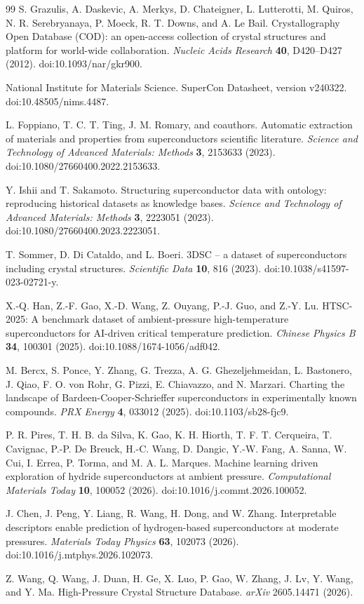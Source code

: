 \documentclass[11pt,a4paper]{ctexart}
\begin{document}
\begin{thebibliography}{99}
S. Grazulis, A. Daskevic, A. Merkys, D. Chateigner, L. Lutterotti, M. Quiros, N. R. Serebryanaya, P. Moeck, R. T. Downs, and A. Le Bail.
Crystallography Open Database (COD): an open-access collection of crystal structures and platform for world-wide collaboration.
\textit{Nucleic Acids Research} \textbf{40}, D420--D427 (2012).
doi:10.1093/nar/gkr900.

National Institute for Materials Science.
SuperCon Datasheet, version v240322.
doi:10.48505/nims.4487.

L. Foppiano, T. C. T. Ting, J. M. Romary, and coauthors.
Automatic extraction of materials and properties from superconductors scientific literature.
\textit{Science and Technology of Advanced Materials: Methods} \textbf{3}, 2153633 (2023).
doi:10.1080/27660400.2022.2153633.

Y. Ishii and T. Sakamoto.
Structuring superconductor data with ontology: reproducing historical datasets as knowledge bases.
\textit{Science and Technology of Advanced Materials: Methods} \textbf{3}, 2223051 (2023).
doi:10.1080/27660400.2023.2223051.

T. Sommer, D. Di Cataldo, and L. Boeri.
3DSC -- a dataset of superconductors including crystal structures.
\textit{Scientific Data} \textbf{10}, 816 (2023).
doi:10.1038/s41597-023-02721-y.

X.-Q. Han, Z.-F. Gao, X.-D. Wang, Z. Ouyang, P.-J. Guo, and Z.-Y. Lu.
HTSC-2025: A benchmark dataset of ambient-pressure high-temperature superconductors for AI-driven critical temperature prediction.
\textit{Chinese Physics B} \textbf{34}, 100301 (2025).
doi:10.1088/1674-1056/adf042.

M. Bercx, S. Ponce, Y. Zhang, G. Trezza, A. G. Ghezeljehmeidan, L. Bastonero, J. Qiao, F. O. von Rohr, G. Pizzi, E. Chiavazzo, and N. Marzari.
Charting the landscape of Bardeen-Cooper-Schrieffer superconductors in experimentally known compounds.
\textit{PRX Energy} \textbf{4}, 033012 (2025).
doi:10.1103/sb28-fjc9.

P. R. Pires, T. H. B. da Silva, K. Gao, K. H. Hiorth, T. F. T. Cerqueira, T. Cavignac, P.-P. De Breuck, H.-C. Wang, D. Dangic, Y.-W. Fang, A. Sanna, W. Cui, I. Errea, P. Torma, and M. A. L. Marques.
Machine learning driven exploration of hydride superconductors at ambient pressure.
\textit{Computational Materials Today} \textbf{10}, 100052 (2026).
doi:10.1016/j.commt.2026.100052.

J. Chen, J. Peng, Y. Liang, R. Wang, H. Dong, and W. Zhang.
Interpretable descriptors enable prediction of hydrogen-based superconductors at moderate pressures.
\textit{Materials Today Physics} \textbf{63}, 102073 (2026).
doi:10.1016/j.mtphys.2026.102073.

Z. Wang, Q. Wang, J. Duan, H. Ge, X. Luo, P. Gao, W. Zhang, J. Lv, Y. Wang, and Y. Ma.
High-Pressure Crystal Structure Database.
\textit{arXiv} 2605.14471 (2026).

\end{thebibliography}
\end{document}
